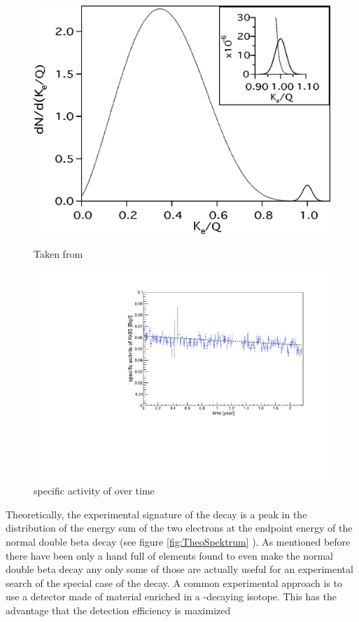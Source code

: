 \begin{figure}[t!]
	\centering
	\begin{minipage}{.5\textwidth}
		\centering
		\includegraphics[width=\textwidth]{./Bilder/TheoretischesSpektrmdes0nubbDecay.png}
		\caption{Taken from \cite{elliott_double_2002}}
		\label{fig:TheoSpektrum}
	\end{minipage}%
	\begin{minipage}{.5\textwidth}
		\centering
		\includegraphics[width=\textwidth]{./Bilder/Aktivitaet.pdf}
		\caption{specific activity of \Kr over time}
		\label{fig:activity}
	\end{minipage}
\end{figure}

Theoretically, the experimental signature of the \onbb decay is a peak in the distribution of the energy sum of the two electrons at the endpoint energy of the normal double beta decay (see figure \ref{fig:TheoSpektrum} ).
As mentioned before there have been only a hand full of elements found to even make the normal double beta decay any only some of those are actually useful for an experimental search of the special case of the \onbb decay.
A common experimental approach is to use a detector made of material enriched in a \onbb-decaying isotope.
This has the advantage that the detection efficiency is maximized
\\

